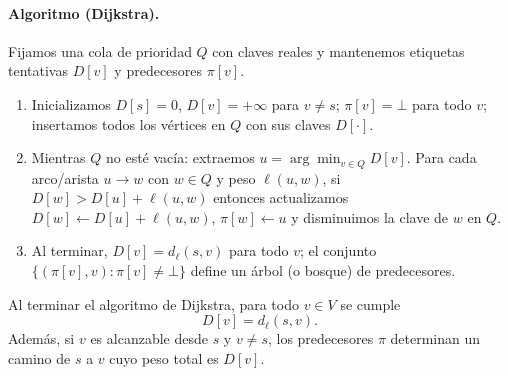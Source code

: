             \paragraph{Algoritmo (Dijkstra).}
                Fijamos una cola de prioridad $Q$ con claves reales y mantenemos etiquetas tentativas $D[v]$ y predecesores $\pi[v]$.
                \begin{enumerate}
                    \item Inicializamos $D[s]=0$, $D[v]=+\infty$ para $v\neq s$; $\pi[v]=\bot$ para todo $v$; insertamos todos los vértices en $Q$ con sus claves $D[\cdot]$.
                    \item Mientras $Q$ no esté vacía: extraemos $u=\arg\min_{v\in Q} D[v]$. Para cada arco/arista $u\to w$ con $w\in Q$ y peso $\ell(u,w)$, si $D[w]>D[u]+\ell(u,w)$ entonces actualizamos $D[w]\gets D[u]+\ell(u,w)$, $\pi[w]\gets u$ y disminuimos la clave de $w$ en $Q$.
                    \item Al terminar, $D[v]=d_\ell(s,v)$ para todo $v$; el conjunto $\{( \pi[v],v): \pi[v]\neq \bot\}$ define un árbol (o bosque) de predecesores.
                \end{enumerate}

            \begin{proposicion}
                Al terminar el algoritmo de Dijkstra, para todo $v\in V$ se cumple
                \[
                    D[v]=d_\ell(s,v).
                \]
                Además, si $v$ es alcanzable desde $s$ y $v\neq s$, los predecesores $\pi$ determinan un camino de $s$ a $v$ cuyo peso total es $D[v]$.
            \end{proposicion}

